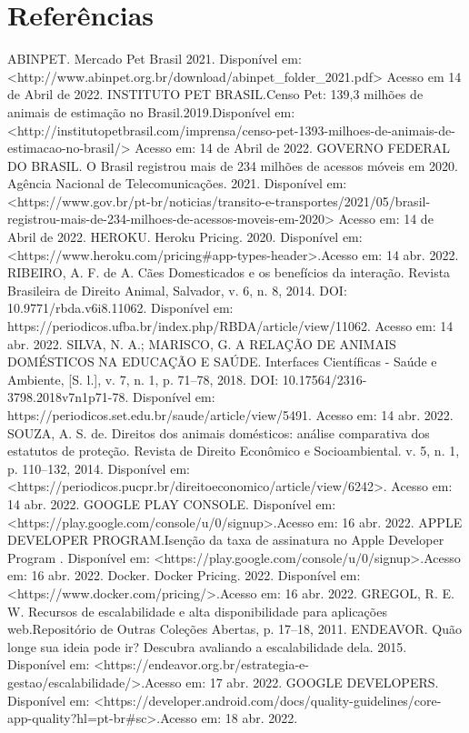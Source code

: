 \chapter{Referências}
ABINPET. Mercado Pet Brasil 2021. Disponível em: <http://www.abinpet.org.br/download/abinpet_folder_2021.pdf> Acesso em 14 de Abril de 2022.
INSTITUTO PET BRASIL.Censo Pet: 139,3 milhões de animais de estimação no Brasil.2019.Disponível em: <http://institutopetbrasil.com/imprensa/censo-pet-1393-milhoes-de-animais-de-estimacao-no-brasil/> Acesso em: 14 de Abril de 2022.
GOVERNO FEDERAL DO BRASIL. O Brasil registrou mais de 234 milhões de acessos móveis em 2020. Agência Nacional de Telecomunicações. 2021. Disponível em: <https://www.gov.br/pt-br/noticias/transito-e-transportes/2021/05/brasil-registrou-mais-de-234-milhoes-de-acessos-moveis-em-2020> Acesso em: 14 de Abril de 2022.
HEROKU. Heroku Pricing. 2020. Disponível em: <https://www.heroku.com/pricing#app-types-header>.Acesso em: 14 abr. 2022.
RIBEIRO, A. F. de A. Cães Domesticados e os benefícios da interação. Revista Brasileira de Direito Animal, Salvador, v. 6, n. 8, 2014. DOI: 10.9771/rbda.v6i8.11062. Disponível em: https://periodicos.ufba.br/index.php/RBDA/article/view/11062. Acesso em: 14 abr. 2022.
SILVA, N. A.; MARISCO, G. A RELAÇÃO DE ANIMAIS DOMÉSTICOS NA EDUCAÇÃO E SAÚDE. Interfaces Científicas - Saúde e Ambiente, [S. l.], v. 7, n. 1, p. 71–78, 2018. DOI: 10.17564/2316-3798.2018v7n1p71-78. Disponível em: https://periodicos.set.edu.br/saude/article/view/5491. Acesso em: 14 abr. 2022.
SOUZA, A. S. de. Direitos dos animais domésticos: análise comparativa dos estatutos de proteção. Revista de Direito Econômico e Socioambiental. v. 5, n. 1, p. 110–132, 2014. Disponível em: <https://periodicos.pucpr.br/direitoeconomico/article/view/6242>. Acesso em: 14 abr. 2022.
GOOGLE PLAY CONSOLE. Disponível em: <https://play.google.com/console/u/0/signup>.Acesso em: 16 abr. 2022.
APPLE DEVELOPER PROGRAM.Isenção da taxa de assinatura no Apple Developer Program
. Disponível em: <https://play.google.com/console/u/0/signup>.Acesso em: 16 abr. 2022.
Docker. Docker Pricing. 2022. Disponível em: <https://www.docker.com/pricing/>.Acesso em: 16 abr. 2022.
GREGOL, R. E. W. Recursos de escalabilidade e alta disponibilidade para aplicações web.Repositório de Outras Coleções Abertas, p. 17–18, 2011.
ENDEAVOR. Quão longe sua ideia pode ir? Descubra avaliando a escalabilidade dela. 2015. Disponível em: <https://endeavor.org.br/estrategia-e-gestao/escalabilidade/>.Acesso em: 17 abr. 2022.
GOOGLE DEVELOPERS. Disponível em: <https://developer.android.com/docs/quality-guidelines/core-app-quality?hl=pt-br#sc>.Acesso em: 18 abr. 2022.
